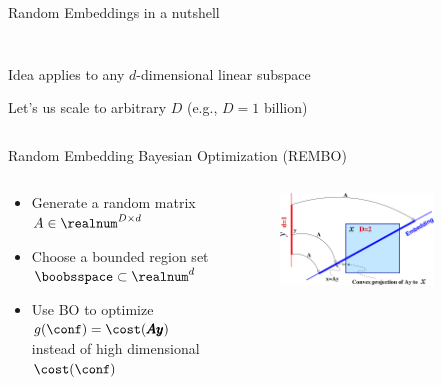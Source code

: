 \begin{frame}[c]{Random Embeddings in a nutshell}
\begin{itemize}
\begin{columns}[T]
\begin{column}{0.5\linewidth}
\begin{figure}
    \end{figure}
    \end{column}
\end{columns}
    \pause
\begin{columns}
\begin{column}{0.45\linewidth}
    \vspace{-8em}
    \item Idea applies to any $d$-dimensional linear subspace
    \item Let's us scale to arbitrary $D$ (e.g., $D=1$ billion)
\end{column}
\begin{column}{0.5\linewidth}

\end{column}
\end{columns}
\end{itemize}


\end{frame}

\begin{frame}[c]{Random Embedding Bayesian Optimization (REMBO)}
\begin{columns}[T]
\begin{column}{0.5\textwidth}
\begin{itemize}
    \item Generate a random matrix $A \in \realnum^{D \times d}$
    \item Choose a bounded region set $\boobsspace\subset\realnum^d$
    \item Use BO to optimize $g(\conf)=\cost(\pmb{Ay})$ instead of high dimensional $\cost(\conf)$
\end{itemize}
\end{column}
\begin{column}{0.5\textwidth}
\begin{figure}
    \includegraphics[width=0.8\textwidth]{images/highdim_images/Embedding.png}
\end{figure}
\end{column}

\end{columns} 
\end{frame}

